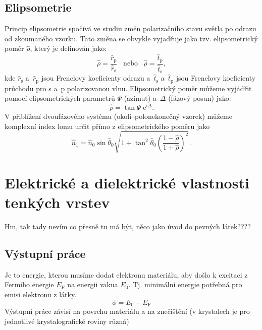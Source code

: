 \documentclass[12pt]{article}
\begin{document}
\subsection{Elipsometrie}
Princip elipsometrie spočívá ve studiu změn polarizačního stavu světla po odrazu od zkoumaného vzorku. Tato změna se obvykle vyjadřuje jako tzv. elipsometrický poměr $\hat{\rho}$, který je definován jako:
\begin{equation} \hat{\rho} = \frac{\hat{r}_\mathrm{p}}{\hat{r}_\mathrm{s}} \;\;\; \mathrm{nebo} \;\;\; \hat{\rho} = \frac{\hat{t}_\mathrm{p}}{\hat{t}_\mathrm{s}} \mathrm{,}\label{elpomer}\end{equation}
kde $\hat{r}_\mathrm{s}$ a~$\hat{r}_\mathrm{p}$ jsou Frenelovy koeficienty odrazu a~$\hat{t}_\mathrm{s}$ a~$\hat{t}_\mathrm{p}$ jsou Frenelovy koeficienty průchodu pro s a~p polarizovanou vlnu. Elipsometrický poměr můžeme vyjádřit pomocí elipsometrických parametrů $\Psi$ (azimut) a~$\Delta$ (fázový posun) jako:
%
\begin{equation} \hat{\rho} = \tan{\Psi} \; \mathrm{e}^{\mathrm{i}\Delta} \mathrm{.}\end{equation}
%
V přiblížení dvoufázového systému (okolí--polonekonečný vzorek) můžeme komplexní index lomu určit přímo z elipsometrického poměru jako
\begin{equation} \hat{n}_1 = \hat{n}_0 \sin \hat{\theta}_0 \sqrt{1 + \tan^2 \hat{\theta}_0 \left(\frac{1 - \hat{\rho}}{1 + \hat{\rho}} \right)^2  } \, \mathrm{.} \label{ellrov} \end{equation}


\section{Elektrické a dielektrické vlastnosti tenkých vrstev}
Hm, tak tady nevím co přesně tu má  být, něco jako úvod do pevných látek????
\subsection{Výstupní práce}
Je to energie, kterou musíme dodat elektronu materiálu, aby došlo k excitaci z Fermiho energie $E_\mathrm{F}$ na energii vakua $E_0$. Tj. minimální energie potřebná pro emisi elektronu z látky.
\begin{equation}
\phi = E_0 - E_\mathrm{F}
\end{equation}
Výstupní práce závisí na povrchu materiálu a na znečištění (v krystalech je pro jednotlivé krystalografické roviny různá)
\end{document}
